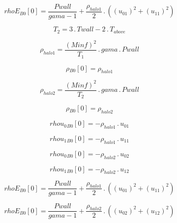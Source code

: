 \documentclass{article}
\begin{document}
\begin{dmath}{rhoE{_{B0}}}[{0}] = \frac{Pwall}{gama - 1} + \frac{\rho_{halo 1}}{2} \,.\, \left(\left(u_{01} \right)^{2} + \left(u_{11} \right)^{2}\right)\end{dmath}

\begin{dmath}T_{2} = 3 \,.\, Twall - 2 \,.\, T_{above}\end{dmath}

\begin{dmath}\rho_{halo 1} = \frac{\left(Minf \right)^{2}}{T_{1}} \,.\, gama \,.\, Pwall\end{dmath}

\begin{dmath}{\rho{_{B0}}}[{0}] = \rho_{halo 1}\end{dmath}

\begin{dmath}\rho_{halo 2} = \frac{\left(Minf \right)^{2}}{T_{2}} \,.\, gama \,.\, Pwall\end{dmath}

\begin{dmath}{\rho{_{B0}}}[{0}] = \rho_{halo 2}\end{dmath}

\begin{dmath}{rhou_{0}{_{B0}}}[{0}] = - \rho_{halo 1} \,.\, u_{01}\end{dmath}

\begin{dmath}{rhou_{1}{_{B0}}}[{0}] = - \rho_{halo 1} \,.\, u_{11}\end{dmath}

\begin{dmath}{rhou_{0}{_{B0}}}[{0}] = - \rho_{halo 2} \,.\, u_{02}\end{dmath}

\begin{dmath}{rhou_{1}{_{B0}}}[{0}] = - \rho_{halo 2} \,.\, u_{12}\end{dmath}

\begin{dmath}{rhoE{_{B0}}}[{0}] = \frac{Pwall}{gama - 1} + \frac{\rho_{halo 1}}{2} \,.\, \left(\left(u_{01} \right)^{2} + \left(u_{11} \right)^{2}\right)\end{dmath}

\begin{dmath}{rhoE{_{B0}}}[{0}] = \frac{Pwall}{gama - 1} + \frac{\rho_{halo 2}}{2} \,.\, \left(\left(u_{02} \right)^{2} + \left(u_{12} \right)^{2}\right)\end{dmath}
\end{document}

